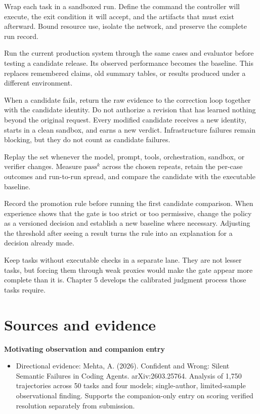 Wrap each task in a sandboxed run. Define the command the controller will execute, the exit condition it will accept, and the artifacts that must exist afterward. Bound resource use, isolate the network, and preserve the complete run record.

Run the current production system through the same cases and evaluator before testing a candidate release. Its observed performance becomes the baseline. This replaces remembered claims, old summary tables, or results produced under a different environment.

When a candidate fails, return the raw evidence to the correction loop together with the candidate identity. Do not authorize a revision that has learned nothing beyond the original request. Every modified candidate receives a new identity, starts in a clean sandbox, and earns a new verdict. Infrastructure failures remain blocking, but they do not count as candidate failures.

Replay the set whenever the model, prompt, tools, orchestration, sandbox, or verifier changes. Measure \(\mathrm{pass}^{k}\) across the chosen repeats, retain the per-case outcomes and run-to-run spread, and compare the candidate with the executable baseline.

Record the promotion rule before running the first candidate comparison. When experience shows that the gate is too strict or too permissive, change the policy as a versioned decision and establish a new baseline where necessary. Adjusting the threshold after seeing a result turns the rule into an explanation for a decision already made.

Keep tasks without executable checks in a separate lane. They are not lesser tasks, but forcing them through weak proxies would make the gate appear more complete than it is. Chapter 5 develops the calibrated judgment process those tasks require.

\section*{Sources and evidence}

\textbf{Motivating observation and companion entry}

\begin{itemize}
\tightlist
\item
  Directional evidence: Mehta, A. (2026). Confident and Wrong: Silent Semantic Failures in Coding Agents. arXiv:2603.25764. Analysis of 1,750 trajectories across 50 tasks and four models; single-author, limited-sample observational finding. Supports the companion-only entry on scoring verified resolution separately from submission.
\end{itemize}

